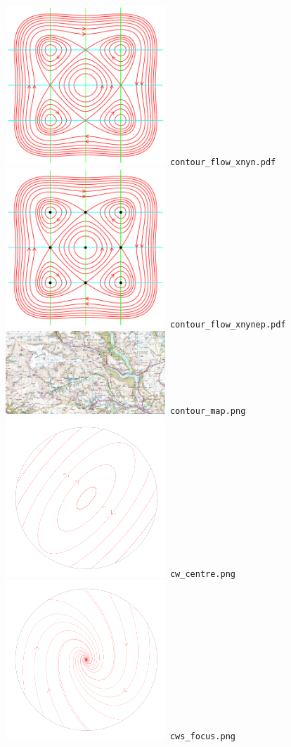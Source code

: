 \documentclass[a4paper]{amsart}
\begin{document}
\includegraphics[width=6cm]{contour_flow_xnyn.pdf}\verb+ contour_flow_xnyn.pdf+\\
\includegraphics[width=6cm]{contour_flow_xnynep.pdf}\verb+ contour_flow_xnynep.pdf+\\
\includegraphics[width=6cm]{contour_map.png}\verb+ contour_map.png+\\
\includegraphics[width=6cm]{cw_centre.png}\verb+ cw_centre.png+\\
\includegraphics[width=6cm]{cws_focus.png}\verb+ cws_focus.png+\\
\end{document}
